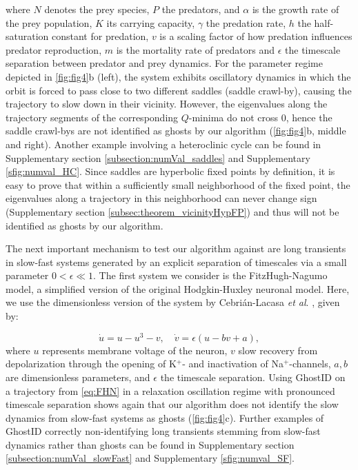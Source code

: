 \documentclass{article}
\theoremstyle{definition}
\begin{document}
\begin{refsection}
where $N$ denotes the prey species, $P$ the predators, and $\alpha$ is the growth rate of the prey population, $K$ its carrying capacity, $\gamma$ the predation rate, $h$ the half-saturation constant for predation, $v$ is a scaling factor of how predation influences predator reproduction, $m$ is the mortality rate of predators and $\epsilon$ the timescale separation between predator and prey dynamics. For the parameter regime depicted in \autoref{fig:fig4}b (left), the system exhibits oscillatory dynamics in which the orbit is forced to pass close to two different saddles (saddle crawl-by), causing the trajectory to slow down in their vicinity. However, the eigenvalues along the trajectory segments of the corresponding $Q$-minima do not cross $0$, hence the saddle crawl-bys are not identified as ghosts by our algorithm (\autoref{fig:fig4}b, middle and right). Another example involving a heteroclinic cycle can be found in Supplementary section \ref{subsection:numVal_saddles} and Supplementary \autoref{sfig:numval_HC}. Since saddles are hyperbolic fixed points by definition, it is easy to prove that within a sufficiently small neighborhood of the fixed point, the eigenvalues along a trajectory in this neighborhood can never change sign (Supplementary section \ref{subsec:theorem_vicinityHypFP}) and thus will not be identified as ghosts by our algorithm.

The next important mechanism to test our algorithm against are long transients in slow-fast systems generated by an explicit separation of timescales via a small parameter $0<\epsilon\ll1$. The first system we consider is the FitzHugh-Nagumo model, a simplified version of the original Hodgkin-Huxley neuronal model. Here, we use the dimensionless version of the system by Cebrián-Lacasa \textit{et al}. \cite{CebrinLacasa2024}, given by:

\begin{equation}
    \dot{u} = u - u^3 - v , \quad \dot{v} = \epsilon (u - b v + a), \label{eq:FHN}
\end{equation}
where $u$ represents membrane voltage of the neuron, $v$ slow recovery from depolarization through the opening of K$^+$- and inactivation of Na$^+$-channels, $a,b$ are dimensionless parameters, and $\epsilon$ the timescale separation. Using GhostID on a trajectory from \autoref{eq:FHN} in a relaxation oscillation regime with pronounced timescale separation shows again that our algorithm does not identify the slow dynamics from slow-fast systems as ghosts (\autoref{fig:fig4}c). Further examples of GhostID correctly non-identifying long transients stemming from slow-fast dynamics rather than ghosts can be found in Supplementary section \ref{subsection:numVal_slowFast} and Supplementary \autoref{sfig:numval_SF}.


\end{refsection}
\end{document}
